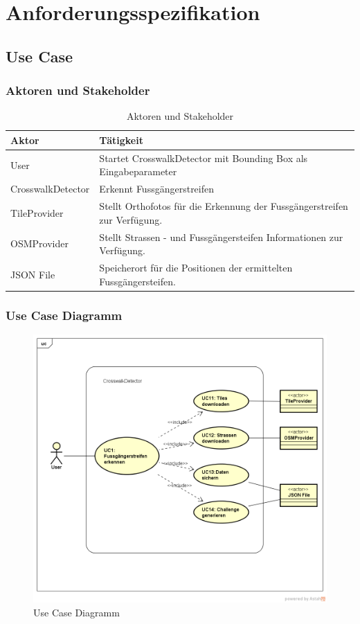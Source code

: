 \section{Anforderungsspezifikation}
\subsection{Use Case}
\subsubsection{Aktoren und Stakeholder}
\begin{table}[H]
\centering
    \begin{tabular}{|p{3cm}|p{9cm}|}
    \hline
    \rowcolor{lightblue}
    Aktor & Tätigkeit   \\ \hline
	User  & Startet CrosswalkDetector mit Bounding Box als Eingabeparameter \\ \hline
	CrosswalkDetector & Erkennt Fussgängerstreifen \\ \hline 
	TileProvider & Stellt Orthofotos für die Erkennung der Fussgängerstreifen zur Verfügung.\\ \hline
	OSMProvider & Stellt Strassen - und Fussgängersteifen Informationen zur Verfügung. \\ \hline
	JSON File & Speicherort für die Positionen der ermittelten Fussgängersteifen.\\ \hline
    \end{tabular}
    \caption[Aktoren und Stakeholder]{Aktoren und Stakeholder}
\end{table}

\subsubsection{Use Case Diagramm}
\begin{figure}[H]
\centering
\includegraphics[width=420pt]{images/UseCase.png}
\caption[Use Case Diagramm]{Use Case Diagramm}
\end{figure}


